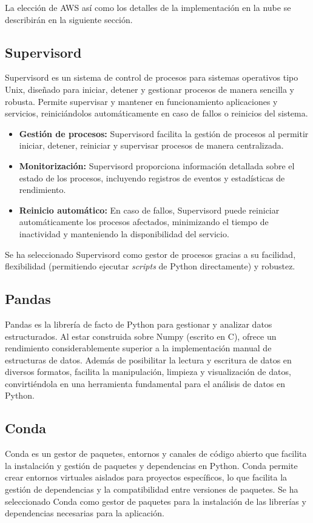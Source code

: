 \noindent La elección de AWS así como los detalles de la implementación en la nube se describirán en la siguiente sección.

\subsection{Supervisord}
Supervisord es un sistema de control de procesos para sistemas operativos tipo Unix, diseñado para iniciar, detener y gestionar procesos de manera sencilla y robusta. Permite supervisar y mantener en funcionamiento aplicaciones y servicios, reiniciándolos automáticamente en caso de fallos o reinicios del sistema.

\begin{itemize}
	\item \textbf{Gestión de procesos:} Supervisord facilita la gestión de procesos al permitir iniciar, detener, reiniciar y supervisar procesos de manera centralizada.
	\item \textbf{Monitorización:} Supervisord proporciona información detallada sobre el estado de los procesos, incluyendo registros de eventos y estadísticas de rendimiento.
	\item \textbf{Reinicio automático:} En caso de fallos, Supervisord puede reiniciar automáticamente los procesos afectados, minimizando el tiempo de inactividad y manteniendo la disponibilidad del servicio.
\end{itemize}

\noindent Se ha seleccionado Supervisord como gestor de procesos gracias a su facilidad, flexibilidad (permitiendo ejecutar \textit{scripts} de Python directamente) y robustez.

\subsection{Pandas}
Pandas es la librería de facto de Python para gestionar y analizar datos estructurados. Al estar construida sobre Numpy (escrito en C), ofrece un rendimiento considerablemente superior a la implementación manual de estructuras de datos. Además de posibilitar la lectura y escritura de datos en diversos formatos, facilita la manipulación, limpieza y visualización de datos, convirtiéndola en una herramienta fundamental para el análisis de datos en Python.

\subsection{Conda}
Conda es un gestor de paquetes, entornos y canales de código abierto que facilita la instalación y gestión de paquetes y dependencias en Python. Conda permite crear entornos virtuales aislados para proyectos específicos, lo que facilita la gestión de dependencias y la compatibilidad entre versiones de paquetes. Se ha seleccionado Conda como gestor de paquetes para la instalación de las librerías y dependencias necesarias para la aplicación.

